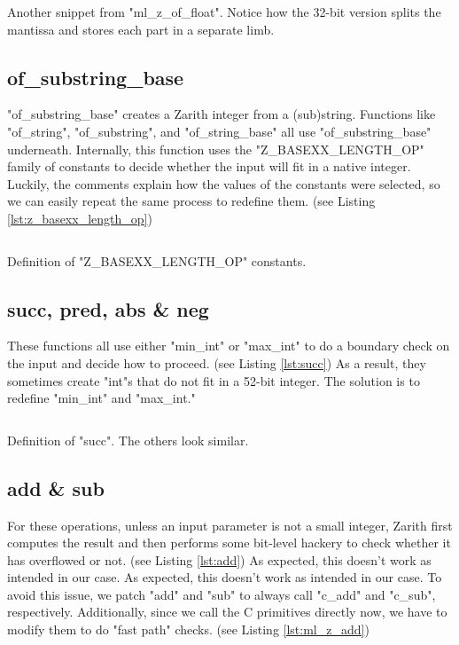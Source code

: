 \documentclass{scrartcl}
\begin{document}
\begin{listing}[ht]
\inputminted[linenos, firstline=550, lastline=563]{c}{caml_z.c}
\caption{Another snippet from "ml\_z\_of\_float". Notice how the 32-bit version splits the mantissa and stores each part in a separate limb.}
\label{lst:ml_z_of_float}
\end{listing}

\subsection{of\_substring\_base}

"of\_substring\_base" creates a Zarith integer from a (sub)string. Functions like "of\_string", "of\_substring", and "of\_string\_base" all use "of\_substring\_base" underneath. Internally, this function uses the "Z\_BASEXX\_LENGTH\_OP" family of constants to decide whether the input will fit in a native integer. Luckily, the comments explain how the values of the constants were selected, so we can easily repeat the same process to redefine them. (see Listing \ref{lst:z_basexx_length_op})

\begin{listing}[ht]
\inputminted[linenos, firstline=194, lastline=202]{c}{caml_z.c}
\caption{Definition of "Z\_BASEXX\_LENGTH\_OP" constants.}
\label{lst:z_basexx_length_op}
\end{listing}

\subsection{succ, pred, abs \& neg}

These functions all use either "min\_int" or "max\_int" to do a boundary check on the input and decide how to proceed. (see Listing \ref{lst:succ}) As a result, they sometimes create "int"s that do not fit in a 52-bit integer. The solution is to redefine "min\_int" and "max\_int."

\begin{listing}[ht]
\inputminted[linenos, firstline=119, lastline=122]{ocaml}{z.ml}
\caption{Definition of "succ". The others look similar.}
\label{lst:succ}
\end{listing}

\subsection{add \& sub}

For these operations, unless an input parameter is not a small integer, Zarith first computes the result and then performs some bit-level hackery to check whether it has overflowed or not. (see Listing \ref{lst:add}) As expected, this doesn't work as intended in our case. As expected, this doesn't work as intended in our case. To avoid this issue, we patch "add" and "sub" to always call "c\_add" and "c\_sub", respectively. Additionally, since we call the C primitives directly now, we have to modify them to do "fast path" checks. (see Listing \ref{lst:ml_z_add})
\end{document}
